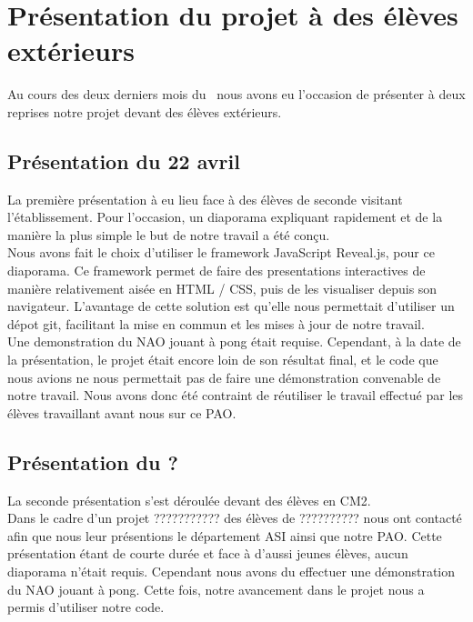 \section{Présentation du projet à des élèves extérieurs}
\label{sec:Présentation du projet à des élèves extérieurs}
  \par Au cours des deux derniers mois du \pao\ nous avons eu l'occasion de présenter à deux reprises notre projet devant des élèves extérieurs.\\

  \subsection{Présentation du 22 avril}
  \label{sub:Présentation du 22 avril}
    \par La première présentation à eu lieu face à des élèves de seconde visitant l'établissement.
    Pour l'occasion, un diaporama expliquant rapidement et de la manière la plus simple le but de notre travail a été conçu.\\
    Nous avons fait le choix d'utiliser le framework JavaScript Reveal.js, pour ce diaporama.
    Ce framework permet de faire des presentations interactives de manière relativement aisée en HTML / CSS, puis de les visualiser depuis son navigateur.
    L'avantage de cette solution est qu'elle nous permettait d'utiliser un dépot git, facilitant la mise en commun et les mises à jour de notre travail.\\
    Une demonstration du NAO jouant à pong était requise.
    Cependant, à la date de la présentation, le projet était encore loin de son résultat final, et le code que nous avions ne nous permettait pas de faire une démonstration convenable de notre travail.
    Nous avons donc été contraint de réutiliser le travail effectué par les élèves travaillant avant nous sur ce PAO.\\

  \subsection{Présentation du ?}
  \label{sub:Présentation du ?}
    \par La seconde présentation s'est déroulée devant des élèves en CM2. \\
    Dans le cadre d'un projet ??????????? des élèves de ?????????? nous ont contacté afin que nous leur présentions le département ASI ainsi que notre PAO.
    Cette présentation étant de courte durée et face à d'aussi jeunes élèves, aucun diaporama n'était requis.
    Cependant nous avons du effectuer une démonstration du NAO jouant à pong.
    Cette fois, notre avancement dans le projet nous a permis d'utiliser notre code.
\pagebreak

